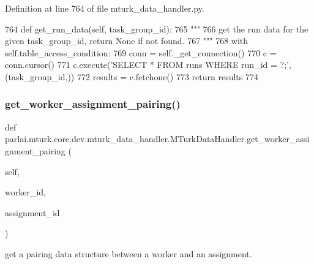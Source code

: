 Definition at line 764 of file mturk\+\_\+data\+\_\+handler.\+py.


\begin{DoxyCode}
764     \textcolor{keyword}{def }get\_run\_data(self, task\_group\_id):
765         \textcolor{stringliteral}{"""}
766 \textcolor{stringliteral}{        get the run data for the given task\_group\_id, return None if not found.}
767 \textcolor{stringliteral}{        """}
768         with self.table\_access\_condition:
769             conn = self.\_get\_connection()
770             c = conn.cursor()
771             c.execute(\textcolor{stringliteral}{'SELECT * FROM runs WHERE run\_id = ?;'}, (task\_group\_id,))
772             results = c.fetchone()
773             \textcolor{keywordflow}{return} results
774 
\end{DoxyCode}
\mbox{\label{classparlai_1_1mturk_1_1core_1_1dev_1_1mturk__data__handler_1_1MTurkDataHandler_a9aa7011c4fdd163ed18b99bbd697da78}} 
\subsubsection{\texorpdfstring{get\+\_\+worker\+\_\+assignment\+\_\+pairing()}{get\_worker\_assignment\_pairing()}}
{\footnotesize\ttfamily def parlai.\+mturk.\+core.\+dev.\+mturk\+\_\+data\+\_\+handler.\+M\+Turk\+Data\+Handler.\+get\+\_\+worker\+\_\+assignment\+\_\+pairing (\begin{DoxyParamCaption}\item[{}]{self,  }\item[{}]{worker\+\_\+id,  }\item[{}]{assignment\+\_\+id }\end{DoxyParamCaption})}

\begin{DoxyVerb}get a pairing data structure between a worker and an assignment.
\end{DoxyVerb}
 

